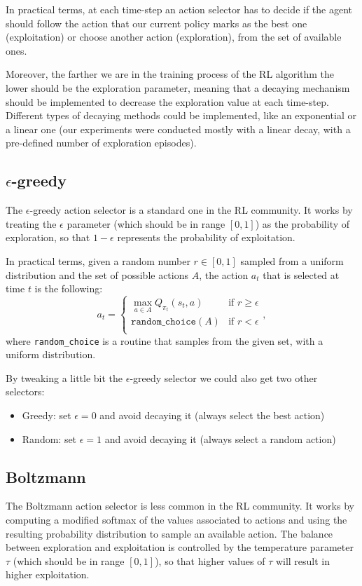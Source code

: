 \documentclass[a4paper,10pt]{report}
\begin{document}
In practical terms, at each time-step an action selector has to decide if the agent should follow the action that our current policy marks as the best one (exploitation) or choose another action (exploration), from the set of available ones.

Moreover, the farther we are in the training process of the RL algorithm the lower should be the exploration parameter, meaning that a decaying mechanism should be implemented to decrease the exploration value at each time-step. Different types of decaying methods could be implemented, like an exponential or a linear one (our experiments were conducted mostly with a linear decay, with a pre-defined number of exploration episodes).

\subsection{$\epsilon$-greedy}
The $\epsilon$-greedy action selector is a standard one in the RL community. It works by treating the $\epsilon$ parameter (which should be in range $[0,1]$) as the probability of exploration, so that $1-\epsilon$ represents the probability of exploitation.

In practical terms, given a random number $r\in[0,1]$ sampled from a uniform distribution and the set of possible actions $A$, the action $a_t$ that is selected at time $t$ is the following:
\[a_t = \left\{
\begin{array}{ll}
      \max_{a\in A} Q_{\pi_t}(s_t,a) & \text{if } r \ge \epsilon \\
      \texttt{random_choice}(A) & \text{if } r < \epsilon \\
\end{array} 
\right., \]
where \texttt{random_choice} is a routine that samples from the given set, with a uniform distribution. 

By tweaking a little bit the $\epsilon$-greedy selector we could also get two other selectors:
\begin{itemize}
	\item Greedy: set $\epsilon=0$ and avoid decaying it (always select the best action)
	\item Random: set $\epsilon=1$ and avoid decaying it (always select a random action)
\end{itemize}

\subsection{Boltzmann}
The Boltzmann action selector is less common in the RL community. It works by computing a modified softmax of the values associated to actions and using the resulting probability distribution to sample an available action. The balance between exploration and exploitation is controlled by the temperature parameter $\tau$ (which should be in range $[0,1]$), so that higher values of $\tau$ will result in higher exploitation. 
\end{document}
